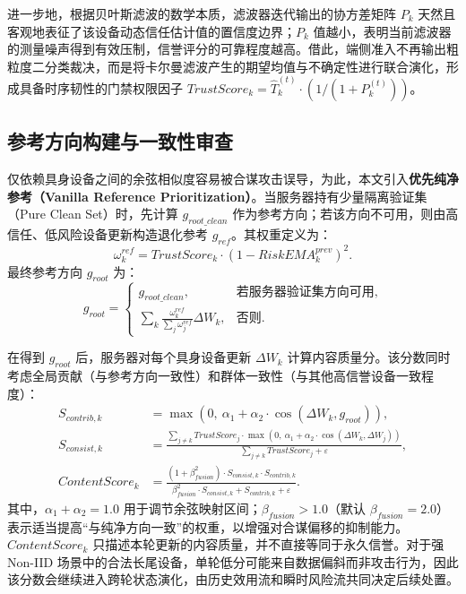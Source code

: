 \documentclass[11pt, a4paper, UTF8, fontset=fandol]{ctexart}
\begin{document}
进一步地，根据贝叶斯滤波的数学本质，滤波器迭代输出的协方差矩阵 $P_k$ 天然且客观地表征了该设备动态信任估计值的置信度边界；$P_k$ 值越小，表明当前滤波器的测量噪声得到有效压制，信誉评分的可靠程度越高。借此，端侧准入不再输出粗粒度二分类裁决，而是将卡尔曼滤波产生的期望均值与不确定性进行联合演化，形成具备时序韧性的门禁权限因子 $TrustScore_k = \hat{T}_k^{(t)} \cdot (1 / (1 + P_k^{(t)}))$。

\subsection{参考方向构建与一致性审查}
仅依赖具身设备之间的余弦相似度容易被合谋攻击误导，为此，本文引入\textbf{优先纯净参考（Vanilla Reference Prioritization）}。当服务器持有少量隔离验证集（Pure Clean Set）时，先计算 $g_{root\_clean}$ 作为参考方向；若该方向不可用，则由高信任、低风险设备更新构造退化参考 $g_{ref}$。其权重定义为：
\begin{equation}
    \omega_{k}^{ref} = TrustScore_{k} \cdot (1 - RiskEMA_{k}^{prev})^{2}.
\end{equation}
最终参考方向 $g_{root}$ 为：
\begin{equation}
    g_{root}=
    \begin{cases}
        g_{root\_clean},                                                      & \text{若服务器验证集方向可用}, \\
        \sum_{k} \frac{\omega_{k}^{ref}}{\sum_j \omega_{j}^{ref}} \Delta W_k, & \text{否则}.
    \end{cases}
\end{equation}

在得到 $g_{root}$ 后，服务器对每个具身设备更新 $\Delta W_k$ 计算内容质量分。该分数同时考虑全局贡献（与参考方向一致性）和群体一致性（与其他高信誉设备一致程度）：
\begin{align}
    S_{contrib,k}    & = \max\left(0,\ \alpha_{1} + \alpha_{2} \cdot \cos(\Delta W_{k}, g_{root})\right),                                                                                             \\
    S_{consist,k}    & = \frac{\sum_{j\neq k} TrustScore_{j} \cdot \max\left(0,\ \alpha_{1} + \alpha_{2} \cdot \cos(\Delta W_{k}, \Delta W_{j})\right)}{\sum_{j\neq k} TrustScore_{j} + \varepsilon}, \\
    ContentScore_{k} & = \frac{(1 + \beta_{fusion}^{2}) \cdot S_{consist,k} \cdot S_{contrib,k}}{\beta_{fusion}^{2}\cdot S_{consist,k} + S_{contrib,k} + \varepsilon}.
\end{align}
其中，$\alpha_1+\alpha_2=1.0$ 用于调节余弦映射区间；$\beta_{fusion}>1.0$（默认 $\beta_{fusion}=2.0$）表示适当提高“与纯净方向一致”的权重，以增强对合谋偏移的抑制能力。$ContentScore_k$ 只描述本轮更新的内容质量，并不直接等同于永久信誉。对于强 Non-IID 场景中的合法长尾设备，单轮低分可能来自数据偏斜而非攻击行为，因此该分数会继续进入跨轮状态演化，由历史效用流和瞬时风险流共同决定后续处置。
\end{document}
